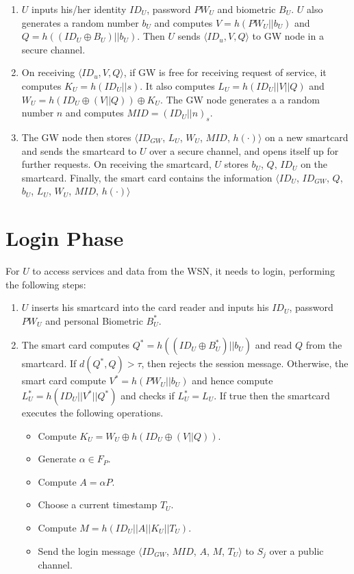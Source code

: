 \documentclass[a4paper,12pt]{report}
\begin{document}
\begin{enumerate}
\item $U$ inputs his/her identity $ID_{U}$, password $PW_U$ and
biometric $B_U$. $U$ also generates a random number $b_U$ and
computes $V = h(PW_{U} || b_{U})$ and $Q = h((ID_{U} \oplus
B_{U})||b_{U})$. Then $U$ sends $\langle ID_u, V, Q\rangle$ to GW
node in a secure channel.

\item On receiving $\langle ID_u, V, Q\rangle$, if GW is free for receiving request of service, it computes $K_{U}
= h(ID_{U}||s)$. It also computes $L_{U} = h(ID_{U} ||V||Q)$ and $
W_{U} = h(ID_{U} \oplus (V||Q)) \oplus K_U$. The GW node generates a
a random number $n$ and computes $MID = (ID_{U}||n)_{s}$.

\item The GW node then stores $\langle ID_{GW}$, $L_{U}$, $W_{U}$, $MID$,
$h(\cdot)\rangle$ on a new smartcard and sends the smartcard to $U$
over a secure channel, and opens itself up for further requests. On receiving the smartcard, $U$ stores
$b_{U}$, $Q$, $ID_{U}$ on the smartcard. Finally, the smart card
contains the information $\langle ID_{U}$, $ID_{GW}$, $Q$, $b_{U}$,
$L_{U}$, $W_{U}$, $MID$, $h(\cdot)\rangle$
\end{enumerate}

\section{Login Phase}

For $U$ to access services and data from the WSN, it needs to login,
performing the following steps:

\begin{enumerate}
\item $U$ inserts his smartcard into the card reader and inputs his
$ID_{U}$, password $PW_{U}$ and personal Biometric $B_{U}^{*}$.

\item The smart card computes $Q^{*} = h((ID_{U}\oplus B_{U}^{*})||b_{U})$
and read $Q$ from the smartcard. If $d(Q^{*},Q) > \tau $, then
rejects the session message. Otherwise, the smart card compute
$V^{*} = h(PW_{U}|| b_{U})$ and hence compute $L_{U}^{*} =
h(ID_{U}||V^{*}||Q^{*})$ and checks if $L_{U}^{*} = L_{U}$. If true
then the smartcard executes the following operations.

\begin{itemize}
\item Compute $K_{U} = W_{U} \oplus h(ID_{U} \oplus (V||Q))$.
\item Generate $\alpha \in F_{P}$.
\item Compute $A = \alpha P$.
\item Choose a current timestamp $T_U$.
\item Compute $M = h(ID_{U}||A||K_{U}||T_{U})$.
\item Send the login message $\langle ID_{GW}$,
$MID$, $A$, $M$, $T_{U}\rangle$ to $S_{j}$ over a public channel.
\end{itemize}
\end{enumerate}
\end{document}
